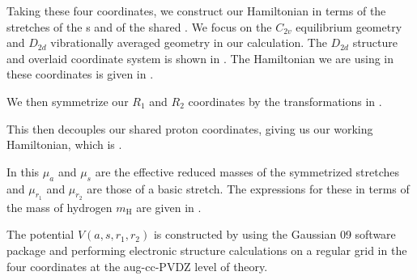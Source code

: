 % 
% 

Taking these four coordinates, we construct our Hamiltonian in terms of the stretches of the \htwo{}s and of the shared \hplus{}. We focus on the $C_{2v}$ equilibrium geometry and $D_{2d}$ vibrationally averaged geometry in our calculation. The $D_{2d}$ structure and overlaid coordinate system is shown in . The Hamiltonian we are using in these coordinates is given in .


We then symmetrize our $R_1$ and $R_2$ coordinates by the transformations in .


This then decouples our shared proton coordinates, giving us our working Hamiltonian, which is .


In this $\mu_{a}$ and $\mu_{s}$ are the effective reduced masses of the symmetrized stretches and $\mu_{r_1}$ and $\mu_{r_2}$ are those of a basic \htwo{} stretch. The expressions for these in terms of the mass of hydrogen $m_{\mathrm{H}}$ are given in .


The potential $V(a, s, r_1, r_2)$ is constructed by using the Gaussian 09 software package and performing electronic structure calculations on a regular grid in the four coordinates at the aug-cc-PVDZ level of theory. 
% 
